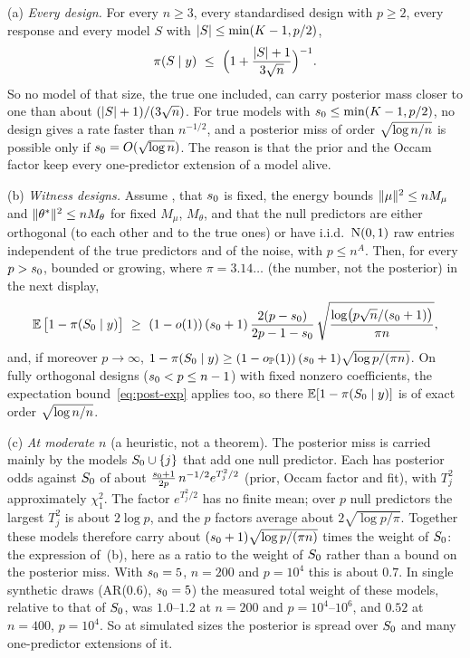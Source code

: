 
\begin{remark}\label{rem:sharp}
\textup{(a)} \emph{Every design.} For every $n\ge3$, every standardised design with $p\ge2$, every response and every
model $S$ with $\lvert S\rvert\le\min(K-1,p/2)$,
\begin{equation}\label{eq:sharp-a}
  \pi(S\mid y)\ \le\ \Big(1+\frac{\lvert S\rvert+1}{3\sqrt n}\Big)^{-1}.
\end{equation}
So no model of that size, the true one included, can carry posterior mass closer to one than about
$(\lvert S\rvert+1)/(3\sqrt n)$. For true models with $s_0\le\min(K-1,p/2)$, no design gives a rate faster than
$n^{-1/2}$, and a posterior miss of order $\sqrt{\log n/n}$ is possible only if $s_0=O(\sqrt{\log n})$. The reason is that the prior and the Occam factor keep every one-predictor extension of a model
alive.

\textup{(b)} \emph{Witness designs.} Assume , that $s_0$ is fixed, the energy bounds $\lVert \mu\rVert^2\le nM_\mu$ and
$\lVert \theta^*\rVert^2\le nM_\theta$ for fixed $M_\mu$, $M_\theta$, and that the null predictors are either orthogonal (to each
other and to the true ones) or have i.i.d.\ $\mathrm{N}(0,1)$ raw entries independent of the true predictors and of the noise, with $p\le n^A$.
Then, for every $p>s_0$, bounded or growing,
where $\pi=3.14\ldots$ (the number, not the posterior) in the next display,
\begin{equation}\label{eq:sharp-b}
  \E\big[1-\pis{\Sz}\big]\ \ge\ (1-o(1))\,(\sz+1)\,\frac{2(p-\sz)}{2p-1-\sz}\,
  \sqrt{\frac{\log\!\big(p\sqrt n/(\sz+1)\big)}{\pi n}},
\end{equation}
and, if moreover $p\to\infty$, $1-\pi(S_0\mid y)\ge(1-o_{\mathbb{P}}(1))\,(s_0+1)\sqrt{\log p/(\pi n)}$. On fully
orthogonal designs ($s_0<p\le n-1$) with fixed nonzero coefficients, the expectation bound~\eqref{eq:post-exp} applies
too, so there $\operatorname{\mathbb{E}}[1-\pi(S_0\mid y)]$ is of exact order $\sqrt{\log n/n}$.

\textup{(c)} \emph{At moderate $n$} (a heuristic, not a theorem). The posterior miss is carried mainly by the models
$S_0\cup\{j\}$ that add one null predictor. Each has posterior odds against $S_0$ of about
$\frac{s_0+1}{2p}\,n^{-1/2}e^{T_j^2/2}$ (prior, Occam factor and fit), with $T_j^2$ approximately $\chi^2_1$. The factor
$e^{T_j^2/2}$ has no finite mean; over $p$ null predictors the largest $T_j^2$ is about $2\log p$, and the $p$ factors
average about $2\sqrt{\log p/\pi}$. Together these models therefore carry about $(s_0+1)\sqrt{\log p/(\pi n)}$ times the
weight of $S_0$: the expression of~(b), here as a ratio to the weight of $S_0$ rather than a bound on the posterior miss. With $s_0=5$, $n=200$ and $p=10^4$ this is about $0.7$. In single
synthetic draws (AR(0.6), $s_0=5$) the measured total weight of these models, relative to that of $S_0$, was $1.0$--$1.2$
at $n=200$ and $p=10^4$--$10^6$, and $0.52$ at $n=400$, $p=10^4$. So at simulated sizes the posterior is spread over $S_0$
and many one-predictor extensions of it.
\end{remark}

